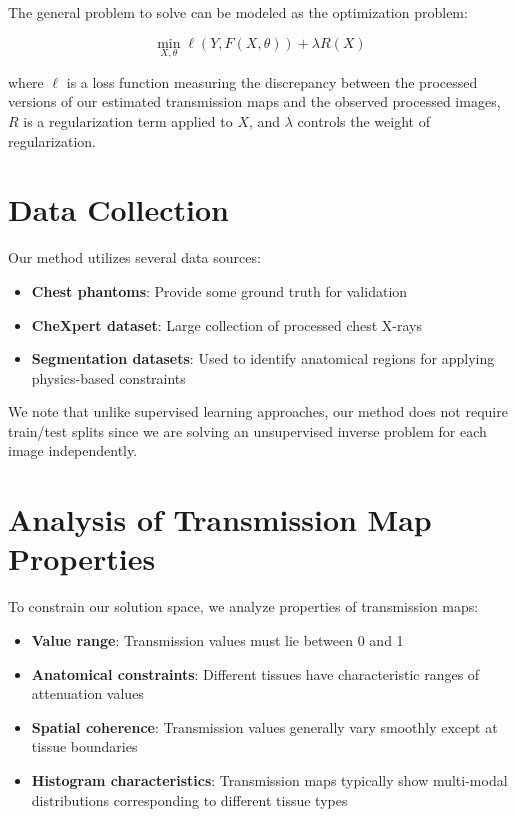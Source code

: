 \documentclass[nomenclature, english, bibtex]{kththesis}
\numberwithin{listing}{chapter}
\begin{document}
The general problem to solve can be modeled as the optimization problem:

\begin{equation}
\min_{X, \theta} \ell(Y, F(X, \theta)) + \lambda R(X)
\end{equation}

where $\ell$ is a loss function measuring the discrepancy between the processed versions of our estimated transmission maps and the observed processed images, $R$ is a regularization term applied to $X$, and $\lambda$ controls the weight of regularization.

\section{Data Collection}
Our method utilizes several data sources:
\begin{itemize}
    \item \textbf{Chest phantoms}: Provide some ground truth for validation
    \item \textbf{CheXpert dataset}: Large collection of processed chest X-rays
    \item \textbf{Segmentation datasets}: Used to identify anatomical regions for applying physics-based constraints
\end{itemize}

We note that unlike supervised learning approaches, our method does not require train/test splits since we are solving an unsupervised inverse problem for each image independently.

\section{Analysis of Transmission Map Properties}
To constrain our solution space, we analyze properties of transmission maps:
\begin{itemize}
    \item \textbf{Value range}: Transmission values must lie between 0 and 1
    \item \textbf{Anatomical constraints}: Different tissues have characteristic ranges of attenuation values
    \item \textbf{Spatial coherence}: Transmission values generally vary smoothly except at tissue boundaries
    \item \textbf{Histogram characteristics}: Transmission maps typically show multi-modal distributions corresponding to different tissue types
\end{itemize}
\end{document}
